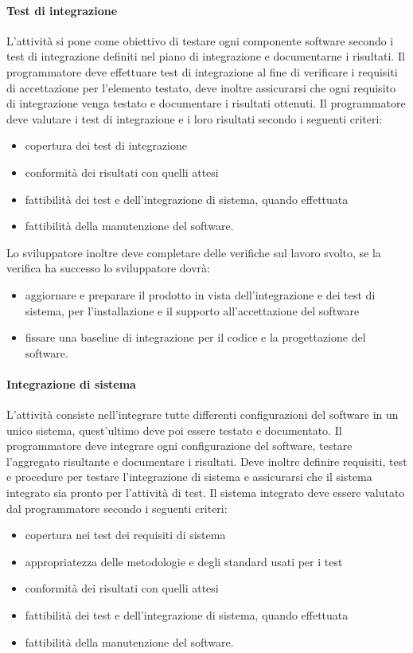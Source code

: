 \documentclass[../../norme-di-progetto.tex]{subfiles}
\begin{document}
\paragraph{Test di integrazione}%
\label{par:test_integrazione}
L'attività si pone come obiettivo di testare ogni componente software secondo i test di integrazione definiti nel piano di integrazione e documentarne i risultati.
Il programmatore deve effettuare test di integrazione al fine di verificare i requisiti di accettazione per l'elemento testato, deve inoltre assicurarsi che ogni requisito di integrazione venga testato e documentare i risultati ottenuti.
Il programmatore deve valutare i test di integrazione e i loro risultati secondo i seguenti criteri:
\begin{itemize}
  \item copertura dei test di integrazione
  \item conformità dei risultati con quelli attesi
  \item fattibilità dei test e dell'integrazione di sistema, quando effettuata
  \item fattibilità della manutenzione del software.
\end{itemize}
Lo sviluppatore inoltre deve completare delle verifiche sul lavoro svolto, se la verifica ha successo lo sviluppatore dovrà:
\begin{itemize}
  \item aggiornare e preparare il prodotto in vista dell'integrazione e dei test di sistema, per l'installazione e il supporto all'accettazione del software
  \item fissare una baseline di integrazione per il codice e la progettazione del software.
\end{itemize}

\paragraph{Integrazione di sistema}%
\label{par:integrazione_sistema}
L'attività consiste nell'integrare tutte differenti configurazioni del software in un unico sistema, quest'ultimo deve poi essere testato e documentato.
Il programmatore deve integrare ogni configurazione del software, testare l'aggregato risultante e documentare i risultati.
Deve inoltre definire requisiti, test e procedure per testare l'integrazione di sistema e assicurarsi che il sistema integrato sia pronto per l'attività di test.
Il sistema integrato deve essere valutato dal programmatore secondo i seguenti criteri:
\begin{itemize}
  \item copertura nei test dei requisiti di sistema
  \item appropriatezza delle metodologie e degli standard usati per i test
  \item conformità dei risultati con quelli attesi
  \item fattibilità dei test e dell'integrazione di sistema, quando effettuata
  \item fattibilità della manutenzione del software.
\end{itemize}
\end{document}
